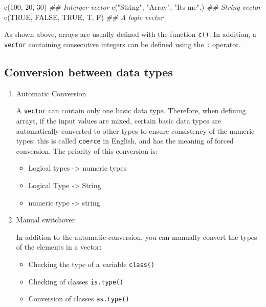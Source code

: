 \documentclass[
]{article}
\newenvironment{Shaded}{}{}
\newcommand{\ConstantTok}[1]{\textcolor[rgb]{0.53,0.00,0.00}{#1}}
\newcommand{\DecValTok}[1]{\textcolor[rgb]{0.25,0.63,0.44}{#1}}
\newcommand{\DocumentationTok}[1]{\textcolor[rgb]{0.73,0.13,0.13}{\textit{#1}}}
\newcommand{\FunctionTok}[1]{\textcolor[rgb]{0.02,0.16,0.49}{#1}}
\newcommand{\NormalTok}[1]{#1}
\newcommand{\StringTok}[1]{\textcolor[rgb]{0.25,0.44,0.63}{#1}}
\begin{document}
\begin{Shaded}
\begin{Highlighting}[]
\FunctionTok{c}\NormalTok{(}\DecValTok{100}\NormalTok{, }\DecValTok{20}\NormalTok{, }\DecValTok{30}\NormalTok{) }\DocumentationTok{\#\# Interger vector }
\FunctionTok{c}\NormalTok{(}\StringTok{"String"}\NormalTok{, }\StringTok{"Array"}\NormalTok{, }\StringTok{"It\textquotesingle{}s me"}\NormalTok{.) }\DocumentationTok{\#\# String vector}
\FunctionTok{c}\NormalTok{(}\ConstantTok{TRUE}\NormalTok{, }\ConstantTok{FALSE}\NormalTok{, }\ConstantTok{TRUE}\NormalTok{, T, F) }\DocumentationTok{\#\# A logic vector}
\end{Highlighting}
\end{Shaded}

As shown above, arrays are usually defined with the function
\texttt{c()}. In addition, a \texttt{vector} containing consecutive
integers can be defined using the \texttt{:} operator.

\hypertarget{conversion-between-data-types}{%
\subsection{Conversion between data
types}\label{conversion-between-data-types}}

\begin{enumerate}
\def\labelenumi{\arabic{enumi}.}
\item
  Automatic Conversion

  A \texttt{vector} can contain only one basic data type. Therefore,
  when defining arrays, if the input values are mixed, certain basic
  data types are automatically converted to other types to ensure
  consistency of the numeric types; this is called \texttt{coerce} in
  English, and has the meaning of forced conversion. The priority of
  this conversion is:

  \begin{itemize}
  \item
    Logical types -\textgreater{} numeric types
  \item
    Logical Type -\textgreater{} String
  \item
    numeric type -\textgreater{} string
  \end{itemize}
\item
  Manual switchover

  In addition to the automatic conversion, you can manually convert the
  types of the elements in a vector:

  \begin{itemize}
  \item
    Checking the type of a variable \texttt{class()}
  \item
    Checking of classes \texttt{is.type()}
  \item
    Conversion of classes \texttt{as.type()}
  \end{itemize}
\end{enumerate}
\end{document}
